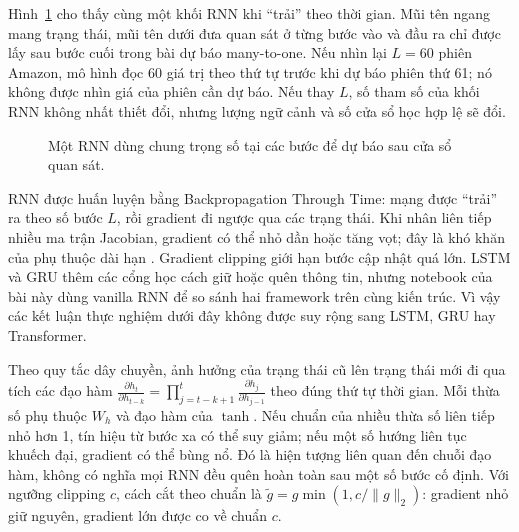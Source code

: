 \documentclass[12pt,a4paper]{report}
\begin{document}
Hình~\ref{fig:essay03-rnn-unrolled} cho thấy cùng một khối RNN khi ``trải'' theo thời gian. Mũi tên ngang mang trạng thái, mũi tên dưới đưa quan sát ở từng bước vào và đầu ra chỉ được lấy sau bước cuối trong bài dự báo many-to-one. Nếu nhìn lại $L=60$ phiên Amazon, mô hình đọc 60 giá trị theo thứ tự trước khi dự báo phiên thứ 61; nó không được nhìn giá của phiên cần dự báo. Nếu thay $L$, số tham số của khối RNN không nhất thiết đổi, nhưng lượng ngữ cảnh và số cửa sổ học hợp lệ sẽ đổi.
\begin{figure}[H]\centering
{}
\caption{Một RNN dùng chung trọng số tại các bước để dự báo sau cửa sổ quan sát.}\label{fig:essay03-rnn-unrolled}
\end{figure}

RNN được huấn luyện bằng Backpropagation Through Time: mạng được ``trải'' ra theo số bước $L$, rồi gradient đi ngược qua các trạng thái. Khi nhân liên tiếp nhiều ma trận Jacobian, gradient có thể nhỏ dần hoặc tăng vọt; đây là khó khăn của phụ thuộc dài hạn \cite{bengio1994}. Gradient clipping giới hạn bước cập nhật quá lớn. LSTM và GRU thêm các cổng học cách giữ hoặc quên thông tin, nhưng notebook của bài này dùng vanilla RNN để so sánh hai framework trên cùng kiến trúc. Vì vậy các kết luận thực nghiệm dưới đây không được suy rộng sang LSTM, GRU hay Transformer.

Theo quy tắc dây chuyền, ảnh hưởng của trạng thái cũ lên trạng thái mới đi qua tích các đạo hàm $\frac{\partial h_t}{\partial h_{t-k}}=\prod_{j=t-k+1}^{t}\frac{\partial h_j}{\partial h_{j-1}}$ theo đúng thứ tự thời gian. Mỗi thừa số phụ thuộc $W_h$ và đạo hàm của $\tanh$. Nếu chuẩn của nhiều thừa số liên tiếp nhỏ hơn 1, tín hiệu từ bước xa có thể suy giảm; nếu một số hướng liên tục khuếch đại, gradient có thể bùng nổ. Đó là hiện tượng liên quan đến chuỗi đạo hàm, không có nghĩa mọi RNN đều quên hoàn toàn sau một số bước cố định. Với ngưỡng clipping $c$, cách cắt theo chuẩn là $\tilde g=g\min(1,c/\lVert g\rVert_2)$: gradient nhỏ giữ nguyên, gradient lớn được co về chuẩn $c$.
\end{document}
